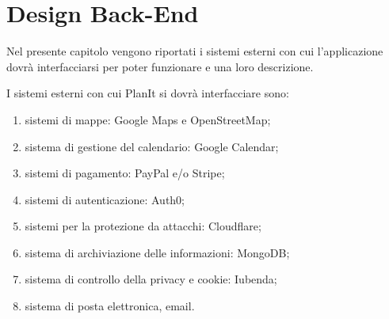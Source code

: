 \section{Design Back-End}
\label{sec:RequisitiBackEnd}

Nel presente capitolo vengono riportati i sistemi esterni con cui l'applicazione dovrà interfacciarsi per poter funzionare e una loro descrizione.

I sistemi esterni con cui PlanIt si dovrà interfacciare sono:
\begin{enumerate}
    \item sistemi di mappe: Google Maps e OpenStreetMap;
    \item sistema di gestione del calendario: Google Calendar;
    \item sistemi di pagamento: PayPal e/o Stripe;
    \item sistemi di autenticazione: Auth0;
    \item sistemi per la protezione da attacchi: Cloudflare;
    \item sistema di archiviazione delle informazioni: MongoDB;
    \item sistema di controllo della privacy e cookie: Iubenda;
    \item sistema di posta elettronica, email.
\end{enumerate}

